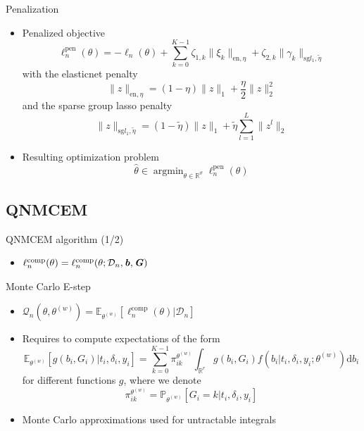 \documentclass{beamer}
\DeclareMathOperator{\argmin}{argmin}
\newcommand{\dd}{\mathrm{d}}
\newcommand{\E}{\mathbb E}
\newcommand{\R}{\mathbb R}
\renewcommand{\P}{\mathds{P}}
\newcommand{\norm}[1]{\|#1\|}
\newcommand{\cD}{\mathcal D}
\newcommand{\cQ}{\mathcal Q}
\renewcommand{\P}{\mathds P}
\begin{document}
\begin{frame}{Penalization}

\small

\begin{itemize}
  \item Penalized objective
  \begin{equation*}
  \ell_n^\text{pen}(\theta) = - \ell_n(\theta) + \sum_{k=0}^{K-1} \zeta_{1,k} \norm{\xi_k}_{\text{en}, \eta} + \zeta_{2,k} \norm{\gamma_k}_{\text{sg} l_1, \tilde{\eta}}
  \end{equation*}
  with the elasticnet penalty \[ \norm{z}_{\text{en}, \eta} = (1-\eta)\norm{z}_1 + \dfrac\eta2 \norm{z}_2^2 \] and the sparse group lasso penalty \[ \norm{z}_{\text{sg} l_1, \tilde{\eta}} = (1-\tilde{\eta})\norm{z}_1 + \tilde{\eta} \sum_{l=1}^L\norm{z^l}_2 \]
  \item Resulting optimization problem \[\hat \theta \in \argmin_{\theta \in \R^\vartheta} \ell_n^\text{pen}(\theta)\]
\end{itemize}

\end{frame}

\subsection{QNMCEM}

\begin{frame}{QNMCEM algorithm (1/2)}

\small

\begin{itemize}
  \item $\ell_n^\text{comp}(\theta) = \ell_n^\text{comp}(\theta ; \cD_n, \textbf{\textit{b}}, \textbf{\textit{G}})$
\end{itemize}

\begin{block}{Monte Carlo E-step}
\begin{itemize}
  \item $\cQ_n(\theta, \theta^{(w)}) = \E_{\theta^{(w)}}[\ell_n^\text{comp}(\theta) | \cD_n]$
  \item Requires to compute expectations of the form
  \footnotesize
\[ \E_{\theta^{(w)}}[ g(b_i, G_i) | t_i, \delta_i, y_i] = \sum_{k=0}^{K-1} \pi_{ik}^{\theta^{(w)}} \int_{\R^r} g(b_i, G_i) f(b_i | t_i, \delta_i, y_i ; \theta^{(w)}) \dd b_i \] 
\small for different functions $g$, where we denote 
\[\pi_{ik}^{\theta^{(w)}} = \P_{\theta^{(w)}}[G_i = k | t_i, \delta_i, y_i] \]
  \item Monte Carlo approximations used for untractable integrals
\end{itemize}
\end{block}


\end{frame}
\end{document}
